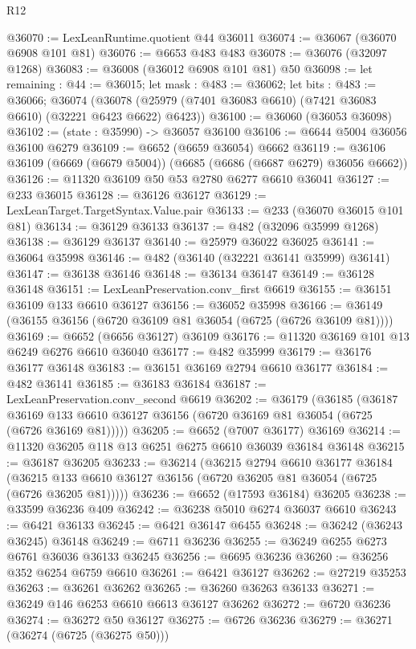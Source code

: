 \begin{lexlean}{R12}
\begin{coremodule}
@36070 := LexLeanRuntime.quotient @44 @36011
@36074 := @36067 (@36070 @6908 @101 @81)
@36076 := @6653 @483 @483
@36078 := @36076 (@32097 @1268)
@36083 := @36008 (@36012 @6908 @101 @81) @50
@36098 := let remaining : @44 := @36015;
  let mask : @483 := @36062;
  let bits : @483 := @36066;
  @36074 (@36078 (@25979 (@7401 @36083 @6610) (@7421 @36083 @6610) (@32221 @6423 @6622) @6423))
@36100 := @36060 (@36053 @36098)
@36102 := (state : @35990) -> @36057 @36100
@36106 := @6644 @5004 @36056 @36100 @6279
@36109 := @6652 (@6659 @36054) @6662
@36119 := @36106 @36109 (@6669 (@6679 @5004)) (@6685 (@6686 (@6687 @6279) @36056 @6662))
@36126 := @11320 @36109 @50 @53 @2780 @6277 @6610 @36041
@36127 := @233 @36015
@36128 := @36126 @36127
@36129 := LexLeanTarget.TargetSyntax.Value.pair
@36133 := @233 (@36070 @36015 @101 @81)
@36134 := @36129 @36133
@36137 := @482 (@32096 @35999 @1268)
@36138 := @36129 @36137
@36140 := @25979 @36022 @36025
@36141 := @36064 @35998
@36146 := @482 (@36140 (@32221 @36141 @35999) @36141)
@36147 := @36138 @36146
@36148 := @36134 @36147
@36149 := @36128 @36148
@36151 := LexLeanPreservation.conv_first @6619
@36155 := @36151 @36109 @133 @6610 @36127
@36156 := @36052 @35998
@36166 := @36149 (@36155 @36156 (@6720 @36109 @81 @36054 (@6725 (@6726 @36109 @81))))
@36169 := @6652 (@6656 @36127) @36109
@36176 := @11320 @36169 @101 @13 @6249 @6276 @6610 @36040
@36177 := @482 @35999
@36179 := @36176 @36177 @36148
@36183 := @36151 @36169 @2794 @6610 @36177
@36184 := @482 @36141
@36185 := @36183 @36184
@36187 := LexLeanPreservation.conv_second @6619
@36202 := @36179
    (@36185
      (@36187 @36169 @133 @6610 @36127 @36156 (@6720 @36169 @81 @36054 (@6725 (@6726 @36169 @81)))))
@36205 := @6652 (@7007 @36177) @36169
@36214 := @11320 @36205 @118 @13 @6251 @6275 @6610 @36039 @36184 @36148
@36215 := @36187 @36205
@36233 := @36214
    (@36215
      @2794
      @6610
      @36177
      @36184
      (@36215 @133 @6610 @36127 @36156 (@6720 @36205 @81 @36054 (@6725 (@6726 @36205 @81)))))
@36236 := @6652 (@17593 @36184) @36205
@36238 := @33599 @36236 @409
@36242 := @36238 @5010 @6274 @36037 @6610
@36243 := @6421 @36133
@36245 := @6421 @36147 @6455
@36248 := @36242 (@36243 @36245) @36148
@36249 := @6711 @36236
@36255 := @36249 @6255 @6273 @6761 @36036 @36133 @36245
@36256 := @6695 @36236
@36260 := @36256 @352 @6254 @6759 @6610
@36261 := @6421 @36127
@36262 := @27219 @35253
@36263 := @36261 @36262
@36265 := @36260 @36263 @36133
@36271 := @36249 @146 @6253 @6610 @6613 @36127 @36262
@36272 := @6720 @36236
@36274 := @36272 @50 @36127
@36275 := @6726 @36236
@36279 := @36271 (@36274 (@6725 (@36275 @50)))

\end{coremodule}
\end{lexlean}
